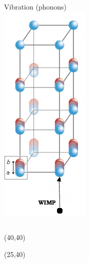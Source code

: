 \documentclass[xcolor=dvipsnames]{beamer}
\begin{document}
\begin{frame}
\begin{columns}[T]
		Vibration (phonons)\\
		\includegraphics[height=0.7\textheight]{Phonons}
	\end{columns}
  \begin{textblock}{70}(40,40)
  \end{textblock}

  \begin{textblock}{80}(25,40)
  \end{textblock}

\end{frame}
\end{document}
